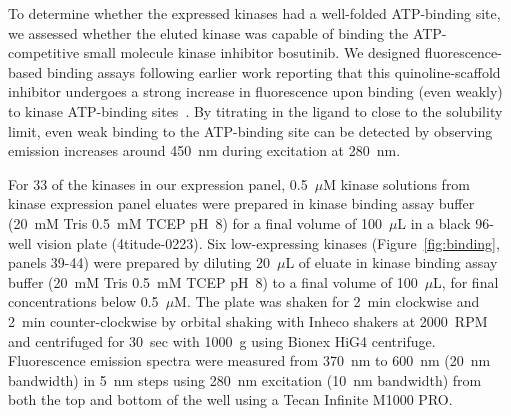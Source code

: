 \documentclass[phd,tocprelim]{cornell}
\begin{document}
To determine whether the expressed kinases had a well-folded ATP-binding site, we assessed whether the eluted kinase was capable of binding the ATP-competitive small molecule kinase inhibitor bosutinib.
We designed fluorescence-based binding assays following earlier work reporting that this quinoline-scaffold inhibitor undergoes a strong increase in fluorescence upon binding (even weakly) to kinase ATP-binding sites~\citep{levinson-boxer:plos-one:2012:bosutinib}.
By titrating in the ligand to close to the solubility limit, even weak binding to the ATP-binding site can be detected by observing emission increases around 450~nm during excitation at 280~nm.

For 33 of the kinases in our expression panel, 0.5~$\mu$M kinase solutions from kinase expression panel eluates were prepared in kinase binding assay buffer (20~mM Tris 0.5~mM TCEP pH~8) for a final volume of 100~$\mu$L in a black 96-well vision plate (4titude-0223). 
Six low-expressing kinases (Figure~\ref{fig:binding}, panels 39-44) were prepared by diluting 20~$\mu$L of eluate in kinase binding assay buffer (20~mM Tris 0.5~mM TCEP pH~8) to a final volume of 100~$\mu$L, for final concentrations below 0.5~$\mu$M. 
The plate was shaken for 2~min clockwise and 2~min counter-clockwise by orbital shaking with Inheco shakers at 2000~RPM and centrifuged for 30~sec with 1000~g using Bionex HiG4 centrifuge. 
Fluorescence emission spectra were measured from 370~nm to 600~nm (20~nm bandwidth) in 5~nm steps using 280~nm excitation (10~nm bandwidth) from both the top and bottom of the well using a Tecan Infinite M1000 PRO. 
\end{document}
